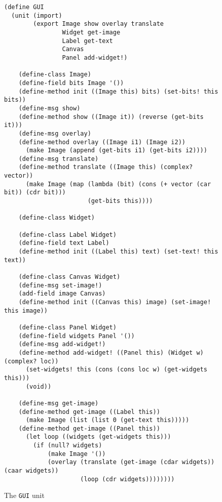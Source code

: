 \documentclass{article}
\newcommand{\code}[1]{\texttt{#1}}
\begin{document}
\begin{figure}
\caption{The \code{GUI} unit}
\label{GUI}
\begin{verbatim}
(define GUI
  (unit (import)
        (export Image show overlay translate
                Widget get-image
                Label get-text
                Canvas
                Panel add-widget!)

    (define-class Image)
    (define-field bits Image '())
    (define-method init ((Image this) bits) (set-bits! this bits))
    (define-msg show)
    (define-method show ((Image it)) (reverse (get-bits it)))
    (define-msg overlay)
    (define-method overlay ((Image i1) (Image i2))
      (make Image (append (get-bits i1) (get-bits i2))))
    (define-msg translate)
    (define-method translate ((Image this) (complex? vector))
      (make Image (map (lambda (bit) (cons (+ vector (car bit)) (cdr bit)))
                       (get-bits this))))
      
    (define-class Widget)

    (define-class Label Widget)
    (define-field text Label)
    (define-method init ((Label this) text) (set-text! this text))

    (define-class Canvas Widget)
    (define-msg set-image!)
    (add-field image Canvas)
    (define-method init ((Canvas this) image) (set-image! this image))

    (define-class Panel Widget)
    (define-field widgets Panel '())
    (define-msg add-widget!)
    (define-method add-widget! ((Panel this) (Widget w) (complex? loc))
      (set-widgets! this (cons (cons loc w) (get-widgets this)))
      (void))

    (define-msg get-image)
    (define-method get-image ((Label this))
      (make Image (list (list 0 (get-text this)))))
    (define-method get-image ((Panel this))
      (let loop ((widgets (get-widgets this)))
        (if (null? widgets)
            (make Image '())
            (overlay (translate (get-image (cdar widgets)) (caar widgets))
                     (loop (cdr widgets))))))))
\end{verbatim}
\end{figure}
\end{document}
